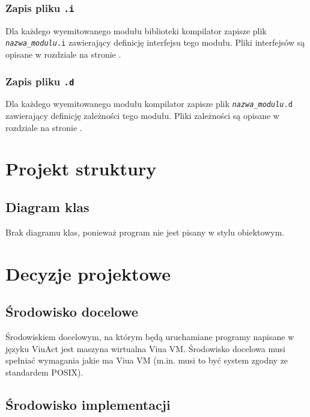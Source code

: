 \documentclass[11pt,oneside,a4paper,titlepage,onecolumn]{article}
\begin{document}
\subsubsection{Zapis pliku \texttt{.i}}

Dla każdego wyemitowanego modułu biblioteki kompilator zapisze plik \texttt{\emph{nazwa\_modulu}.i}
zawierający definicję interfejsu tego modułu. Pliki interfejsów są opisane w rozdziale
 na stronie \pageref{pliki_interfejsow_modulow}.

\subsubsection{Zapis pliku \texttt{.d}}

Dla każdego wyemitowanego modułu kompilator zapisze plik \texttt{\emph{nazwa\_modulu}.d}
zawierający definicję zależności tego modułu. Pliki zależności są opisane w rozdziale
 na stronie \pageref{pliki_zaleznosci_modulow}.

\newpage

\section{Projekt struktury}

\subsection{Diagram klas}

Brak diagramu klas, ponieważ program nie jest pisany w stylu obiektowym.

\section{Decyzje projektowe}

\subsection{Środowisko docelowe}

Środowiskiem docelowym, na którym będą uruchamiane programy napisane w języku ViuAct jest maszyna wirtualna
Viua VM. Środowisko docelowa musi spełniać wymagania jakie ma Viua VM (m.in. musi to być system zgodny ze
standardem POSIX).

\subsection{Środowisko implementacji}
\end{document}
